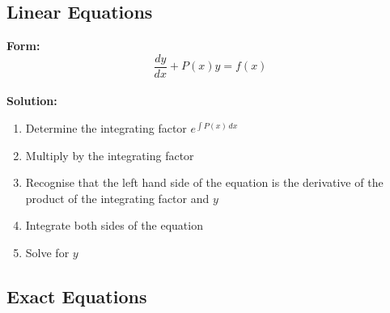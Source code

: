 \documentclass{article}
\begin{document}
\subsection{Linear Equations}

\textbf{Form:} \[\frac{d y}{d x} + P(x) y = f(x)\] \\ \textbf{Solution:}

\begin{enumerate}
  \item Determine the integrating factor $e^{\int P(x) \,d x}$

  \item Multiply by the integrating factor

  \item Recognise that the left hand side of the equation is the derivative of the product of the integrating factor and $y$

  \item Integrate both sides of the equation

  \item Solve for $y$
\end{enumerate}

\subsection{Exact Equations}
\end{document}
